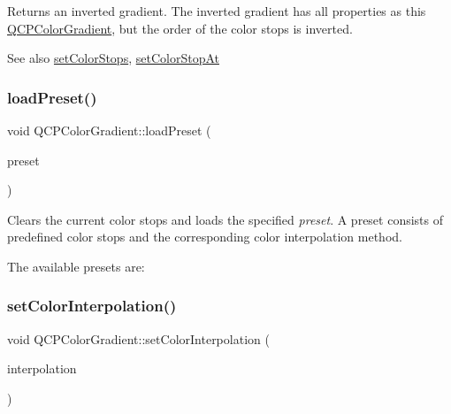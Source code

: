 Returns an inverted gradient. The inverted gradient has all properties as this \hyperlink{class_q_c_p_color_gradient}{Q\+C\+P\+Color\+Gradient}, but the order of the color stops is inverted.

\begin{DoxySeeAlso}{See also}
\hyperlink{class_q_c_p_color_gradient_a724e828aa6f0ba5011a9392477c35d3a}{set\+Color\+Stops}, \hyperlink{class_q_c_p_color_gradient_a3b48be5e78079db1bb2a1188a4c3390e}{set\+Color\+Stop\+At} 
\end{DoxySeeAlso}
\mbox{\label{class_q_c_p_color_gradient_aa0aeec1528241728b9671bf8e60b1622}} 
\subsubsection{\texorpdfstring{load\+Preset()}{loadPreset()}}
{\footnotesize\ttfamily void Q\+C\+P\+Color\+Gradient\+::load\+Preset (\begin{DoxyParamCaption}\item[{\hyperlink{class_q_c_p_color_gradient_aed6569828fee337023670272910c9072}{Gradient\+Preset}}]{preset }\end{DoxyParamCaption})}

Clears the current color stops and loads the specified {\itshape preset}. A preset consists of predefined color stops and the corresponding color interpolation method.

The available presets are\+:  \mbox{\label{class_q_c_p_color_gradient_aa13fda86406e1d896a465a409ae63b38}} 
\subsubsection{\texorpdfstring{set\+Color\+Interpolation()}{setColorInterpolation()}}
{\footnotesize\ttfamily void Q\+C\+P\+Color\+Gradient\+::set\+Color\+Interpolation (\begin{DoxyParamCaption}\item[{\hyperlink{class_q_c_p_color_gradient_ac5dca17cc24336e6ca176610e7f77fc1}{Q\+C\+P\+Color\+Gradient\+::\+Color\+Interpolation}}]{interpolation }\end{DoxyParamCaption})}


